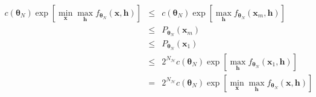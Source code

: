 \documentclass[12pt]{article}
\theoremstyle{definition}
\begin{document}
 \begin{eqnarray*}
  c(\boldsymbol \theta_N) \exp[\min_{\boldsymbol x}\max_{\boldsymbol h}f_{\boldsymbol \theta_N} (\boldsymbol x , \boldsymbol h)]
  &\leq & c(\boldsymbol \theta_N) \exp[ \max_{\boldsymbol h}f_{\boldsymbol \theta_N} (\boldsymbol x_m , \boldsymbol h)]
 \\& \leq& P_{\boldsymbol \theta_N} (\boldsymbol x_m) \\&\leq& P_{\boldsymbol \theta_N} (\boldsymbol x_1)\\ &\leq &  2^{N_{\mathcal{H}}} c(\boldsymbol \theta_N) \exp[ \max_{\boldsymbol h}f_{\boldsymbol \theta_N} (\boldsymbol x_1 , \boldsymbol h)]\\&=&2^{N_{\mathcal{H}}} c(\boldsymbol \theta_N) \exp[\min_{\boldsymbol x}\max_{\boldsymbol h}f_{\boldsymbol \theta_N} (\boldsymbol x , \boldsymbol h)]
\end{eqnarray*}
\end{document}
